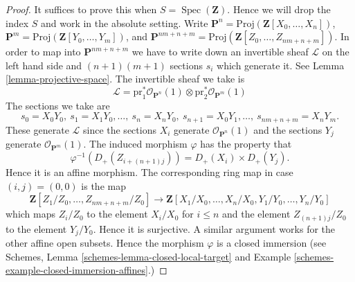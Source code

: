 \documentclass{stacks-project}
\theoremstyle{plain}
\theoremstyle{definition}
\theoremstyle{remark}
\numberwithin{equation}{subsection}
\def\Spec{\mathop{\mathrm{Spec}}}
\begin{document}
\begin{proof}
It suffices to prove this when $S = \Spec(\mathbf{Z})$.
Hence we will drop the index $S$ and work in the absolute setting.
Write $\mathbf{P}^n = \text{Proj}(\mathbf{Z}[X_0, \ldots, X_n])$,
$\mathbf{P}^m = \text{Proj}(\mathbf{Z}[Y_0, \ldots, Y_m])$,
and
$\mathbf{P}^{nm + n + m} =
\text{Proj}(\mathbf{Z}[Z_0, \ldots, Z_{nm + n + m}])$.
In order to map into $\mathbf{P}^{nm + n + m}$ we have to
write down an invertible sheaf $\mathcal{L}$ on the left hand
side and $(n + 1)(m + 1)$ sections $s_i$ which generate it.
See Lemma \ref{lemma-projective-space}.
The invertible sheaf we take is
$$
\mathcal{L} =
\text{pr}_1^*\mathcal{O}_{\mathbf{P}^n}(1)
\otimes
\text{pr}_2^*\mathcal{O}_{\mathbf{P}^m}(1)
$$
The sections we take are
$$
s_0 = X_0Y_0, \ s_1 = X_1Y_0, \ldots, \ s_n = X_nY_0,
\ s_{n + 1} = X_0Y_1, \ldots, \ s_{nm + n + m} = X_nY_m.
$$
These generate $\mathcal{L}$ since the sections $X_i$ generate
$\mathcal{O}_{\mathbf{P}^n}(1)$ and the sections $Y_j$ generate
$\mathcal{O}_{\mathbf{P}^m}(1)$. The induced morphism
$\varphi$ has the property that
$$
\varphi^{-1}(D_{+}(Z_{i + (n + 1)j})) = D_{+}(X_i) \times D_{+}(Y_j).
$$
Hence it is an affine morphism. The corresponding ring map in case
$(i, j) = (0, 0)$ is the map
$$
\mathbf{Z}[Z_1/Z_0, \ldots, Z_{nm + n + m}/Z_0]
\longrightarrow
\mathbf{Z}[X_1/X_0, \ldots, X_n/X_0, Y_1/Y_0, \ldots, Y_n/Y_0]
$$
which maps $Z_i/Z_0$ to the element $X_i/X_0$ for $i \leq n$ and
the element $Z_{(n + 1)j}/Z_0$ to the element $Y_j/Y_0$. Hence it
is surjective. A similar argument works for the other affine
open subsets. Hence the morphism $\varphi$ is a closed immersion
(see Schemes, Lemma \ref{schemes-lemma-closed-local-target} and
Example \ref{schemes-example-closed-immersion-affines}.)
\end{proof}
\end{document}
